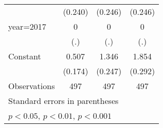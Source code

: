 {\begin{tabular}{l*{3}{c}}
                    &     (0.240)         &     (0.246)         &     (0.246)         \\
[1em]
year=2017           &           0         &           0         &           0         \\
                    &         (.)         &         (.)         &         (.)         \\
[1em]
Constant            &       0.507\sym{**} &       1.346\sym{***}&       1.854\sym{***}\\
                    &     (0.174)         &     (0.247)         &     (0.292)         \\
\hline
Observations        &         497         &         497         &         497         \\
\hline\hline
\multicolumn{4}{l}{\footnotesize Standard errors in parentheses}\\
\multicolumn{4}{l}{\footnotesize \sym{*} \(p<0.05\), \sym{**} \(p<0.01\), \sym{***} \(p<0.001\)}\\
\end{tabular}
}
